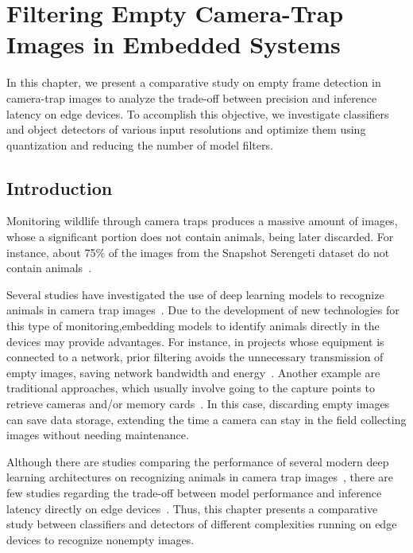 \chapter{Filtering Empty Camera-Trap Images in Embedded
Systems}\label{cap:filtering}

In this chapter, we present a comparative study on empty frame detection in
camera-trap images to analyze the trade-off between precision and inference
latency on edge devices. To accomplish this objective, we investigate
classifiers and object detectors of various input resolutions and optimize them
using quantization and reducing the number of model filters.

\section{Introduction}

Monitoring wildlife through camera traps produces a massive amount of images,
whose a significant portion does not contain animals, being later discarded.
For instance, about 75\% of the images from the Snapshot Serengeti
dataset do not contain animals~\citep{dryad_5pt92}.

Several studies have investigated the use of deep learning
models to recognize animals in camera trap images~\citep{beery2018recognition,
norouzzadeh2018automatically, schneider2020three, tabak2019machine,
villa2017towards, willi2019identifying}. Due to the development of new
technologies for this type of monitoring,embedding models to identify animals
directly in the devices may provide advantages. For instance, in projects whose
equipment is connected to a network, prior filtering avoids the unnecessary
transmission of empty images, saving network bandwidth and
energy~\citep{elias2017s}. Another example are traditional approaches, which
usually involve going to the capture points to retrieve cameras and/or memory
cards~\citep{team_protocol}. In this case, discarding empty images can save data
storage, extending the time a camera can stay in the field collecting images
without needing maintenance.

Although there are studies comparing the performance of several modern deep
learning architectures on recognizing animals in camera trap
images~\citep{norouzzadeh2018automatically, schneider2020three,
villa2017towards}, there are few studies regarding the trade-off between model
performance and inference latency directly on edge
devices~\citep{tyden2020edge,zualkernan2020towards,schneider2020three}. Thus,
this chapter presents a comparative study between classifiers and detectors of
different complexities running on edge devices to recognize nonempty images.

